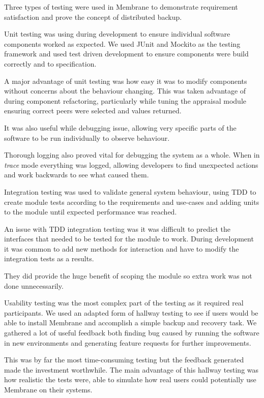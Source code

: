 \documentclass[11pt, a4paper, twoside]{report}
\begin{document}
Three types of testing were used in Membrane to demonstrate requirement satisfaction and prove the concept of distributed backup.

Unit testing was using during development to ensure individual software components worked as expected. We used JUnit and Mockito as the testing framework and used test driven development to ensure components were build correctly and to specification.

A major advantage of unit testing was how easy it was to modify components without concerns about the behaviour changing. This was taken advantage of during component refactoring, particularly while tuning the appraisal module ensuring correct peers were selected and values returned.

It was also useful while debugging issue, allowing very specific parts of the software to be run individually to observe behaviour.

Thorough logging also proved vital for debugging the system as a whole. When in \emph{trace} mode everything was logged, allowing developers to find unexpected actions and work backwards to see what caused them.

Integration testing was used to validate general system behaviour, using TDD to create module tests according to the requirements and use-cases and adding units to the module until expected performance was reached.

An issue with TDD integration testing was it was difficult to predict the interfaces that needed to be tested for the module to work. During development it was common to add new methods for interaction and have to modify the integration tests as a results.

They did provide the huge benefit of scoping the module so extra work was not done unnecessarily.

Usability testing was the most complex part of the testing as it required real participants. We used an adapted form of hallway testing to see if users would be able to install Membrane and accomplish a simple backup and recovery task. We gathered a lot of useful feedback both finding bug caused by running the software in new environments and generating feature requests for further improvements.

This was by far the most time-consuming testing but the feedback generated made the investment worthwhile. The main advantage of this hallway testing was how realistic the tests were, able to simulate how real users could potentially use Membrane on their systems.
\end{document}
